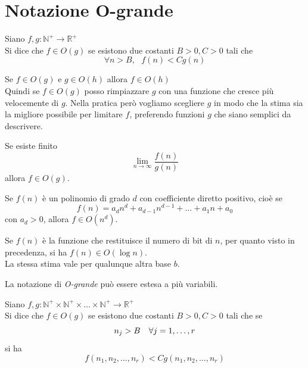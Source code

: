 \documentclass[a4paper,12pt, oneside]{book}
\begin{document}
\section{Notazione O-grande}
\begin{definizione}
	Siano $f,g : \mathbb{N}^{+} \rightarrow \mathbb{R}^{+}$\\
	Si dice che $f \in O(g)$ se esistono due costanti $B>0, C>0$ tali che $$\forall n > B, \mbox{  } f(n) < Cg(n)$$
\end{definizione}
\begin{osservazione}
	Se $f \in O(g)$ e $g \in O(h)$ allora $f \in O(h)$\\
	Quindi se $f \in O(g)$ posso rimpiazzare $g$ con una funzione che cresce più velocemente di $g$. Nella pratica però vogliamo scegliere $g$ in modo che la stima sia la migliore possibile per limitare $f$, preferendo funzioni $g$ che siano semplici da descrivere.
\end{osservazione}
\begin{osservazione}
	Se esiste finito $$ \lim_{n \to \infty} \frac{f(n)}{g(n)} $$ allora $f \in O(g)$.
\end{osservazione}
\begin{osservazione}
	Se $f(n)$ è un polinomio di grado $d$ con coefficiente diretto positivo, cioè se $$f(n) = a_{d} n^{d} + a_{d-1} n^{d-1} + \dots + a_{1} n + a_0$$ con $a_d > 0$, allora $f \in O(n^d)$.
\end{osservazione}
\begin{osservazione}
	Se $f(n)$ è la funzione che restituisce il numero di bit di $n$, per quanto visto in precedenza, si ha $f(n) \in O(\log n)$.\\
	La stessa stima vale per qualunque altra base $b$.
\end{osservazione}
La notazione di \textit{O-grande} può essere estesa a più variabili.
\begin{definizione}
	Siano $f,g : \mathbb{N}^{+} \times \mathbb{N}^{+} \times \dots \times \mathbb{N}^{+} \rightarrow \mathbb{R}^{+}$\\
	Si dice che $f \in O(g)$ se esistono due costanti $B>0, C>0$ tali che se $$n_j > B \mbox{ \space\space} \forall j = 1, \dots, r$$ si ha $$f(n_1,n_2,\dots,n_r) < Cg(n_1,n_2,\dots,n_r)$$
\end{definizione}
\end{document}
